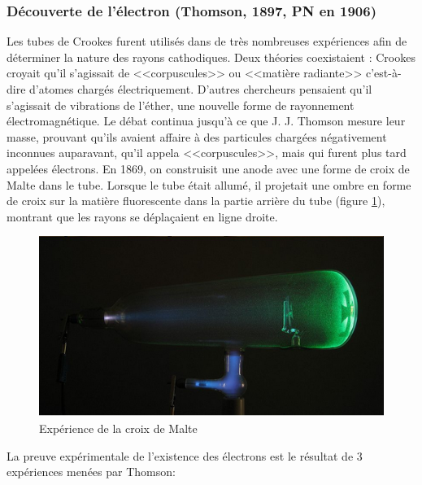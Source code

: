 \subsubsection{Découverte de l'électron (Thomson, 1897, PN en 1906)}
Les tubes de Crookes furent utilisés dans de très nombreuses expériences afin de déterminer la nature des rayons cathodiques. Deux théories coexistaient : Crookes croyait qu'il s'agissait de <<corpuscules>> ou <<matière radiante>> c'est-à-dire d'atomes chargés électriquement. D'autres chercheurs pensaient qu'il s'agissait de vibrations de l'éther, une nouvelle forme de rayonnement électromagnétique. Le débat continua jusqu'à ce que J. J. Thomson mesure leur masse, prouvant qu'ils avaient affaire à des particules chargées négativement inconnues auparavant, qu'il appela <<corpuscules>>, mais qui furent plus tard appelées électrons. En 1869, on construisit une anode avec une forme de croix de Malte dans le tube. Lorsque le tube était allumé, il projetait une ombre en forme de croix sur la matière fluorescente dans la partie arrière du tube (figure \ref{fig:croix_de_malte}), montrant que les rayons se déplaçaient en ligne droite.

\begin{figure}[ht]
    \centering
    \includegraphics[scale=0.60]{Images1/croixmalte.PNG}
    \caption{Expérience de la croix de Malte}
    \label{fig:croix_de_malte}
\end{figure}

La preuve expérimentale de l'existence des électrons est le résultat de 3 expériences menées par Thomson:

